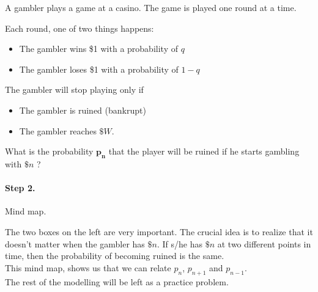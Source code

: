 \begin{example}

A gambler plays a game at a casino. The game is played one round at a time. 
\vfill

Each round, one of two things happens:
\begin{itemize}
\item The gambler wins \$1 with a probability of $q$
\item The gambler loses \$1 with a probability of $1-q$\\
\end{itemize}

The gambler will stop playing only if
\begin{itemize}
\item The gambler is ruined (bankrupt)
\item The gambler reaches $\$W$.\\
\end{itemize}

What is the probability $\pmb{p_n}$ that the player will be ruined if he starts gambling with $\$n$  ?	 \\


\paragraph{Step 2.} Mind map.
\begin{center}
\end{center}


The two boxes on the left are very important. The crucial idea is to realize that it doesn't matter when the gambler has $\$n$. If s/he has $\$n$ at two different points in time, then the probability of becoming ruined is the same. \\

This mind map, shows us that we can relate $p_n$, $p_{n+1}$ and $p_{n-1}$.\\

The rest of the modelling will be left as a practice problem.

\end{example}


